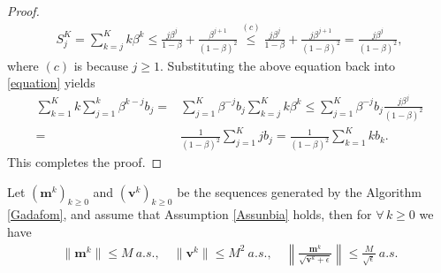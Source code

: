 \documentclass[twoside,11pt]{article}
\begin{document}
\begin{proof}
\begin{equation}
   	\begin{aligned}
   	S_j^K
   	=\sum_{k=j}^{K}k\beta^{k}
   	\le\frac{j \beta^j}{1-\beta}+\frac{\beta^{j+1}}{(1-\beta)^2}
   	\overset{(c)}{\le}\frac{j \beta^j}{1-\beta}+\frac{j\beta^{j+1}}{(1-\beta)^2}
   	=\frac{j\beta^{j}}{(1-\beta)^2},\nonumber
   	\end{aligned}
\end{equation}
where $(c)$ is because $j\ge 1$. Substituting the above equation back into \eqref{equation} yields
\begin{equation}
   	\begin{aligned}
   	\sum_{k=1}^{K}k\sum_{j=1}^{k}\beta^{k-j}b_j
   	=&\sum_{j=1}^{K}\beta^{-j}b_j\sum_{k=j}^{K}k\beta^{k}
   	\le\sum_{j=1}^{K}\beta^{-j}b_j\frac{j\beta^{j}}{(1-\beta)^2}\\
   	=&\frac{1}{(1-\beta)^2}\sum_{j=1}^{K}j b_j
   	=\frac{1}{(1-\beta)^2}\sum_{k=1}^{K}k b_k.\nonumber
   	\end{aligned}
\end{equation}
This completes the proof.
\end{proof}
\begin{lemma}\label{Lemmbound}
Let $(\mathbf{m}^k)_{k\ge 0}$ and $({\mathbf{v}}^k)_{k\ge 0}$ be the sequences generated  by the Algorithm \ref{Gadafom}, and assume that Assumption \ref{Assunbia} holds, then for $\forall\, k\ge 0$ we have
\begin{align}\label{Lemmbound.1}
	\lVert\mathbf{m}^k \rVert
	\le M\ a.s.,\quad 
	\lVert\mathbf{v}^k \rVert
	 \le M^2\ a.s.,\quad 
	\left\|  \frac{\mathbf{m}^k}{\sqrt{\mathbf{v}^k+\epsilon}} \right\|  \le \frac{M}{\sqrt{\epsilon}}\ a.s.
\end{align}
\end{lemma}
\end{document}
